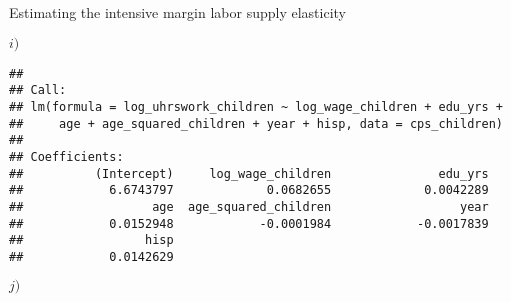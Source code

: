 \documentclass[
  ignorenonframetext,
]{beamer}
\begin{document}
\begin{frame}[fragile]{Estimating the intensive margin labor supply
elasticity}
\begin{block}{\(i)\)}
\begin{verbatim}
## 
## Call:
## lm(formula = log_uhrswork_children ~ log_wage_children + edu_yrs + 
##     age + age_squared_children + year + hisp, data = cps_children)
## 
## Coefficients:
##          (Intercept)     log_wage_children               edu_yrs  
##            6.6743797             0.0682655             0.0042289  
##                  age  age_squared_children                  year  
##            0.0152948            -0.0001984            -0.0017839  
##                 hisp  
##            0.0142629
\end{verbatim}

\hfill\break
\hfill\break
\hfill\break
\end{block}

\begin{block}{\(j)\)}
\protect\hypertarget{j}{}
\hfill\break

\hfill\break
\hfill\break
\hfill\break
\hfill\break
\hfill\break
\end{block}
\end{frame}
\end{document}
